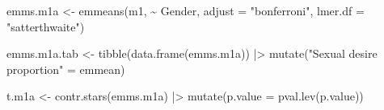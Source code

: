 \documentclass[
  bookmarksnumbered]{article}
\newenvironment{Shaded}{\begin{snugshade}}{\end{snugshade}}
\newcommand{\AttributeTok}[1]{\textcolor[rgb]{0.80,0.80,0.80}{#1}}
\newcommand{\FunctionTok}[1]{\textcolor[rgb]{0.94,0.94,0.56}{#1}}
\newcommand{\NormalTok}[1]{\textcolor[rgb]{0.80,0.80,0.80}{#1}}
\newcommand{\OtherTok}[1]{\textcolor[rgb]{0.94,0.94,0.56}{#1}}
\newcommand{\SpecialCharTok}[1]{\textcolor[rgb]{0.86,0.64,0.64}{#1}}
\newcommand{\StringTok}[1]{\textcolor[rgb]{0.80,0.58,0.58}{#1}}
\begin{document}
\begin{Shaded}
\begin{Highlighting}[]
\NormalTok{emms.m1a }\OtherTok{\textless{}{-}} \FunctionTok{emmeans}\NormalTok{(m1, }\SpecialCharTok{\textasciitilde{}}\NormalTok{ Gender,}
                    \AttributeTok{adjust =} \StringTok{"bonferroni"}\NormalTok{,}
                    \AttributeTok{lmer.df =} \StringTok{"satterthwaite"}\NormalTok{)}

\NormalTok{emms.m1a.tab }\OtherTok{\textless{}{-}} \FunctionTok{tibble}\NormalTok{(}\FunctionTok{data.frame}\NormalTok{(emms.m1a)) }\SpecialCharTok{|\textgreater{}}
  \FunctionTok{mutate}\NormalTok{(}\StringTok{"Sexual desire proportion"} \OtherTok{=}\NormalTok{ emmean)}

\NormalTok{t.m1a }\OtherTok{\textless{}{-}} \FunctionTok{contr.stars}\NormalTok{(emms.m1a) }\SpecialCharTok{|\textgreater{}} 
  \FunctionTok{mutate}\NormalTok{(}\AttributeTok{p.value =} \FunctionTok{pval.lev}\NormalTok{(p.value))}


\end{Highlighting}
\end{Shaded}
\end{document}
